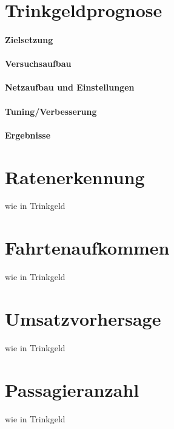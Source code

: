 \section{Trinkgeldprognose}
\label{sec:TipPred}
\paragraph{Zielsetzung}
\paragraph{Versuchsaufbau}
\paragraph{Netzaufbau und Einstellungen}
\paragraph{Tuning/Verbesserung}
\paragraph{Ergebnisse}
\section{Ratenerkennung}
\label{sec:RatePred}
wie in Trinkgeld
\section{Fahrtenaufkommen}
\label{sec:RidesPred}
wie in Trinkgeld
\section{Umsatzvorhersage}
\label{sec:RevPred}
wie in Trinkgeld
\section{Passagieranzahl}
\label{sec:PasPred}
wie in Trinkgeld